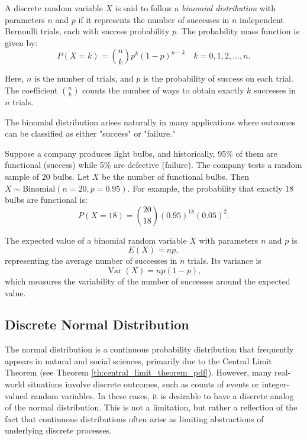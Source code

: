 \begin{definition}
\label{def:binomial_distribution}
A discrete random variable $X$ is said to follow a \emph{binomial distribution} with parameters $n$ and $p$ if it represents the number of successes in $n$ independent Bernoulli trials, each with success probability $p$. The probability mass function is given by:
\[
P(X = k) = \binom{n}{k} p^k (1 - p)^{n - k} \quad k = 0, 1, 2, \ldots, n.
\]
\end{definition}

Here, $n$ is the number of trials, and $p$ is the probability of success on each trial. The coefficient $\binom{n}{k}$ counts the number of ways to obtain exactly $k$ successes in $n$ trials.

The binomial distribution arises naturally in many applications where outcomes can be classified as either "success" or "failure."

\begin{example}
Suppose a company produces light bulbs, and historically, 95\% of them are functional (success) while 5\% are defective (failure). The company tests a random sample of $20$ bulbs. Let $X$ be the number of functional bulbs. Then $X \sim \text{Binomial}(n=20, p=0.95)$. For example, the probability that exactly $18$ bulbs are functional is:
\[
P(X = 18) = \binom{20}{18} (0.95)^{18} (0.05)^2.
\]
\end{example}

The expected value of a binomial random variable $X$ with parameters $n$ and $p$ is
\[
E(X) = np,
\]
representing the average number of successes in $n$ trials. Its variance is
\[
\operatorname{Var}(X) = np(1 - p),
\]
which measures the variability of the number of successes around the expected value.

%
%

\subsection{Discrete Normal Distribution}

The normal distribution is a continuous probability distribution that frequently appears in natural and social sciences, primarily due to the Central Limit Theorem (see Theorem \ref{th:central_limit_theorem_pdf}). However, many real-world situations involve discrete outcomes, such as counts of events or integer-valued random variables. In these cases, it is desirable to have a discrete analog of the normal distribution. This is not a limitation, but rather a reflection of the fact that continuous distributions often arise as limiting abstractions of underlying discrete processes.

